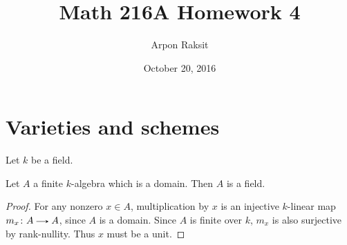 

\title{Math 216A Homework 4}
\author{Arpon Raksit}
\date{October 20, 2016}




\maketitle

\newcommand{\Closeds}{\operatorname{Closeds}}
\newcommand{\Frac}{\operatorname{Frac}}
\newcommand{\Opens}{\operatorname{Opens}}
\newcommand{\MaxSpec}{\operatorname{MaxSpec}}


\section{Varieties and schemes}

\begin{notation*}
  Let $k$ be a field.
\end{notation*}

\begin{lemma}
  \label{finite-domain}
  Let $A$ a finite $k$-algebra which is a domain. Then $A$ is a field.

  \begin{proof}
    For any nonzero $x \in A$, multiplication by $x$ is an injective $k$-linear map $m_x \c A \to A$, since $A$ is a domain. Since $A$ is finite over $k$, $m_x$ is also surjective by rank-nullity. Thus $x$ must be a unit.
  \end{proof}
\end{lemma}

